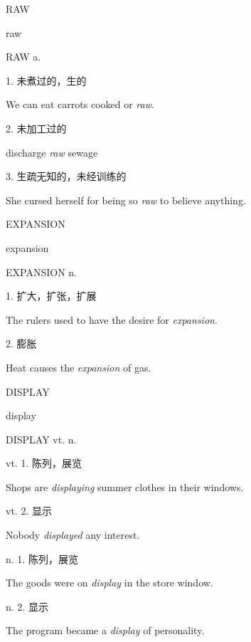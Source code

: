 \begin{flashcard}{
RAW

raw
}
\begin{center}
RAW a. 
\end{center}
1. 未煮过的，生的

We can eat carrots cooked or \textit{raw}.

2. 未加工过的

discharge \textit{raw} sewage

3. 生疏无知的，未经训练的

She cursed herself for being so \textit{raw} to believe anything.

\end{flashcard}
\begin{flashcard}{
EXPANSION

expansion
}
\begin{center}
EXPANSION n. 
\end{center}
1. 扩大，扩张，扩展

The rulers used to have the desire for \textit{expansion}.

2. 膨胀

Heat causes the \textit{expansion} of gas.

\end{flashcard}
\begin{flashcard}{
DISPLAY

display
}
\begin{center}
DISPLAY vt. n. 
\end{center}
vt. 1. 陈列，展览

Shops are \textit{displaying} summer clothes in their windows.

vt. 2. 显示

Nobody \textit{displayed} any interest.

n. 1. 陈列，展览

The goods were on \textit{display} in the store window.

n. 2. 显示

The program became a \textit{display} of personality.

\end{flashcard}
